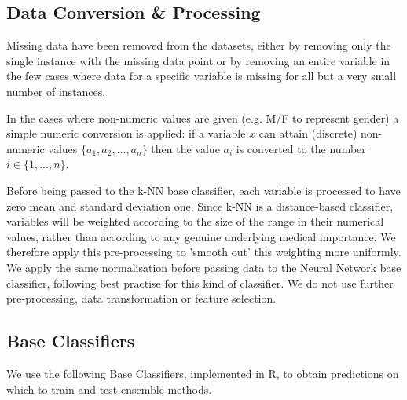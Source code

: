 \documentclass{bmcart}
\begin{document}
\subsection*{Data Conversion \& Processing}

Missing data have been removed from the datasets, either by removing only the single instance with the missing data point or by removing an entire variable in the few cases where data for a specific variable is missing for all but a very small number of instances.

In the cases where non-numeric values are given (e.g. M/F to represent gender) a simple numeric conversion is applied: if a variable $x$ can attain (discrete) non-numeric values $\{a_{1}, a_{2}, ..., a_{n}\}$ then the value $a_{i}$ is converted to the number $i \in \{1,...,n\}$.

Before being passed to the k-NN base classifier, each variable is processed to have zero mean and standard deviation one. Since k-NN is a distance-based classifier, variables will be weighted according to the size of the range in their numerical values, rather than according to any genuine underlying medical importance. We therefore apply this pre-processing to 'smooth out' this weighting more uniformly. We apply the same normalisation before passing data to the Neural Network base classifier, following best practise for this kind of classifier. We do not use further pre-processing, data transformation or feature selection.


\subsection*{Base Classifiers}

We use the following Base Classifiers, implemented in R, to obtain predictions on which to train and test ensemble methods.
\end{document}
